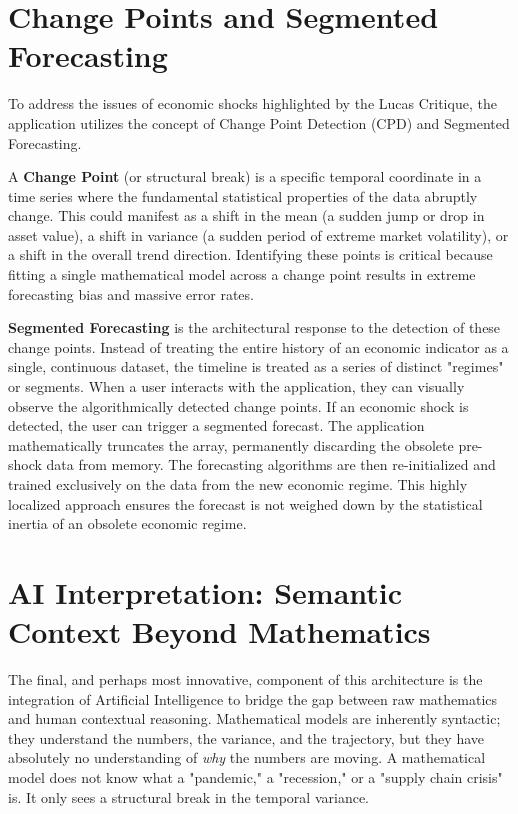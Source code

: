 \section{Change Points and Segmented Forecasting}
To address the issues of economic shocks highlighted by the Lucas Critique, the application utilizes the concept of Change Point Detection (CPD) \cite{BaiPerron1998} and Segmented Forecasting. 

A \textbf{Change Point} (or structural break) is a specific temporal coordinate in a time series where the fundamental statistical properties of the data abruptly change. This could manifest as a shift in the mean (a sudden jump or drop in asset value), a shift in variance (a sudden period of extreme market volatility), or a shift in the overall trend direction. Identifying these points is critical because fitting a single mathematical model across a change point results in extreme forecasting bias and massive error rates.

\textbf{Segmented Forecasting} is the architectural response to the detection of these change points. Instead of treating the entire history of an economic indicator as a single, continuous dataset, the timeline is treated as a series of distinct "regimes" or segments. When a user interacts with the application, they can visually observe the algorithmically detected change points. If an economic shock is detected, the user can trigger a segmented forecast. The application mathematically truncates the array, permanently discarding the obsolete pre-shock data from memory. The forecasting algorithms are then re-initialized and trained exclusively on the data from the new economic regime. This highly localized approach ensures the forecast is not weighed down by the statistical inertia of an obsolete economic regime.

\section{AI Interpretation: Semantic Context Beyond Mathematics}
The final, and perhaps most innovative, component of this architecture is the integration of Artificial Intelligence to bridge the gap between raw mathematics and human contextual reasoning. Mathematical models are inherently syntactic; they understand the numbers, the variance, and the trajectory, but they have absolutely no understanding of \textit{why} the numbers are moving. A mathematical model does not know what a "pandemic," a "recession," or a "supply chain crisis" is. It only sees a structural break in the temporal variance.

